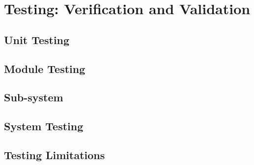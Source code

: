 \section{Testing: Verification and Validation}

\subsection{Unit Testing}

\subsection{Module Testing}

\subsection{Sub-system}

\subsection{System Testing}

\subsection{Testing Limitations}